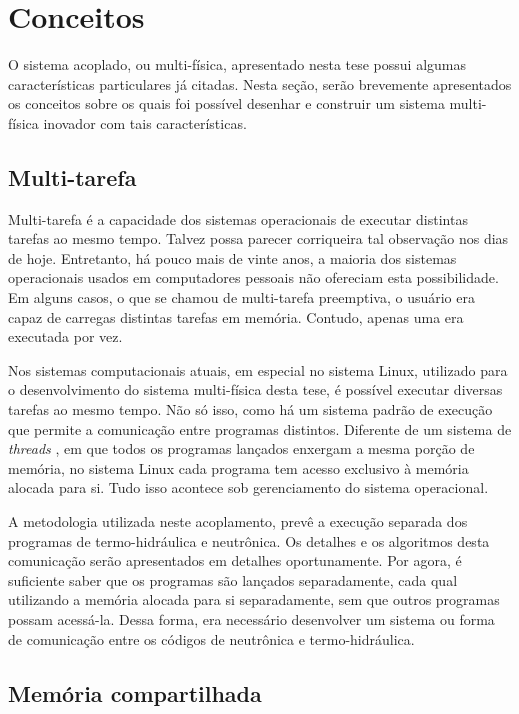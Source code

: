 \section{Conceitos}
\label{sec:conc}

O sistema acoplado, ou multi-física, apresentado nesta tese possui algumas características
particulares já citadas. Nesta seção, serão brevemente apresentados os conceitos sobre os quais
foi possível desenhar e construir um sistema multi-física inovador com tais características.

\subsection{Multi-tarefa}
\label{subsec:mt}

Multi-tarefa é a capacidade dos sistemas operacionais de executar distintas tarefas ao mesmo tempo.
Talvez possa parecer corriqueira tal observação nos dias de hoje. Entretanto, há pouco mais de vinte
anos, a maioria dos sistemas operacionais usados em computadores pessoais não ofereciam esta
possibilidade. Em alguns casos, o que se chamou de multi-tarefa preemptiva, o usuário era capaz de
carregas distintas tarefas em memória. Contudo, apenas uma era executada por vez.

Nos sistemas computacionais atuais, em especial no sistema Linux, utilizado para o desenvolvimento
do sistema multi-física desta tese, é possível executar diversas tarefas ao mesmo tempo. Não só isso,
como há um sistema padrão de execução que permite a comunicação entre programas distintos. Diferente
de um sistema de \textit{threads} \cite{Walli1995},
em que todos os programas lançados enxergam a mesma
porção de memória, no sistema Linux cada programa tem acesso exclusivo à memória alocada para si.
Tudo isso acontece sob gerenciamento do sistema operacional.

A metodologia utilizada neste acoplamento, prevê a execução separada dos programas de termo-hidráulica
e neutrônica. Os detalhes e os algoritmos desta comunicação serão apresentados em detalhes oportunamente.
Por agora, é suficiente saber que os programas são lançados separadamente, cada qual utilizando a memória
alocada para si separadamente, sem que outros programas possam acessá-la. Dessa forma, era necessário
desenvolver um sistema ou forma de comunicação entre os códigos de neutrônica e termo-hidráulica.

\subsection{Memória compartilhada}
\label{subsec:mc}

